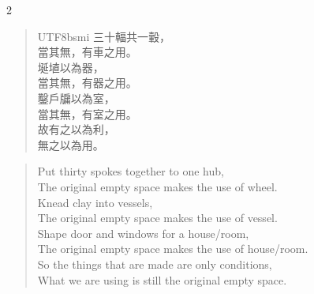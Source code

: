 \begin{paracol}{2}
\begin{verse}
\begin{CJK*}{UTF8}{bsmi}
三十輻共一轂，\\
當其無，有車之用。\\
埏埴以為器，\\
當其無，有器之用。\\
鑿戶牖以為室，\\
當其無，有室之用。\\
故有之以為利，\\
無之以為用。
\end{CJK*}
\end{verse}
\switchcolumn
\begin{verse}
Put thirty spokes together to one hub,\\
The original empty space makes the use of wheel.\\
Knead clay into vessels,\\
The original empty space makes the use of vessel.\\
Shape door and windows for a house/room,\\
The original empty space makes the use of house/room.\\
So the things that are made are only conditions,\\
What we are using is still the original empty space.
\end{verse}
\end{paracol}



